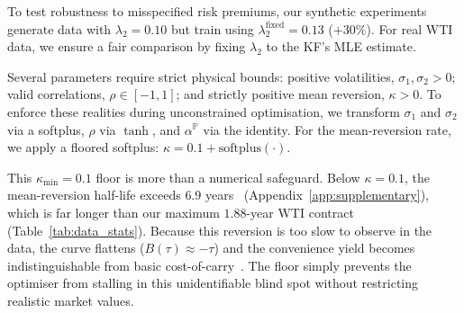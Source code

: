 \documentclass[sigconf, authorversion=true, nonacm=true]{acmart}
\begin{document}
To test robustness to misspecified risk premiums, our synthetic experiments generate data with $\lambda_2 = 0.10$ but train using $\lambda_2^{\text{fixed}} = 0.13$ ($+30\%$). For real WTI data, we ensure a fair comparison by fixing $\lambda_2$ to the KF's MLE estimate.

Several parameters require strict physical bounds: positive volatilities, $\sigma_1, \sigma_2 > 0$; valid correlations, $\rho \in [-1, 1]$; and strictly positive mean reversion, $\kappa > 0$. To enforce these realities during unconstrained optimisation, we transform $\sigma_1$ and $\sigma_2$ via a softplus, $\rho$ via $\tanh$, and $\alpha^{\mathbb{P}}$ via the identity. For the mean-reversion rate, we apply a floored softplus: $\kappa = 0.1 + \mathrm{softplus}(\cdot)$.

This $\kappa_{\min} = 0.1$ floor is more than a numerical safeguard. Below $\kappa = 0.1$, the mean-reversion half-life exceeds $6.9$ years~\cite{uhlenbeck1930theory} (Appendix~\ref{app:supplementary}), which is far longer than our maximum $1.88$-year WTI contract (Table~\ref{tab:data_stats}). Because this reversion is too slow to observe in the data, the curve flattens ($B(\tau) \approx -\tau$) and the convenience yield becomes indistinguishable from basic cost-of-carry~\cite{cox1981relation}. The floor simply prevents the optimiser from stalling in this unidentifiable blind spot without restricting realistic market values.

\end{document}
